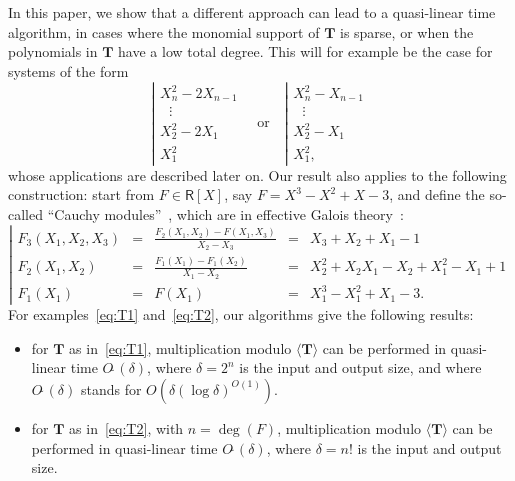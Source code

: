 \documentclass[amsthm]{elsart}
\def\T {\ensuremath{\mathbf{T}}}
\def\rng {\ensuremath{\mathsf{R}}}
\theoremstyle{plain}
\begin{document}
In this paper, we show that a different approach can lead to a
quasi-linear time algorithm, in cases where the monomial support of
$\T$ is sparse, or when the polynomials in $\T$ have a low total
degree. 
This will for example be the case for systems of the form
\begin{equation}
  \label{eq:T1}
\left | \begin{array}{l}
X_n^2-2X_{n-1}\\
~~~\vdots\\
X_2^2-2X_1\\
X_1^2
\end{array}\right .
\quad\text{or}\quad
\left | \begin{array}{l}
X_n^2-X_{n-1}\\
~~~\vdots\\
X_2^2-X_1\\
X_1^2,
\end{array}\right .
\end{equation}
whose applications are described later on. Our result also applies to
the following construction: start from $F\in \rng[X]$, say
$F=X^3-X^2+X-3$, and define the so-called ``Cauchy
modules''~\cite{ReVa99}, which are in effective Galois
theory~\cite{ReVa99,AbOrReVa04,ReYo06}:
\begin{equation}
  \label{eq:T2}
\left | \begin{array}{lllll}
F_3(X_1,X_2,X_3)&=&\frac{F_2(X_1,X_2)-F(X_1,X_3)}{X_2-X_3}&=&X_3+X_2+X_1-1\\[1mm]
F_2(X_1,X_2)&=&\frac{F_1(X_1)-F_1(X_2)}{X_1-X_2} &=& X_2^2 + X_2X_1 - X_2 + X_1^2 - X_1 + 1\\[1mm]
F_1(X_1)&=&F(X_1)&=&X_1^3-X_1^2+X_1-3.
\end{array}\right .
\end{equation}
For examples~\eqref{eq:T1} and~\eqref{eq:T2}, our algorithms give the
following results:

\smallskip

\begin{itemize}
\item for $\T$ as in~\eqref{eq:T1}, multiplication modulo $\langle \T
  \rangle$ can be performed in quasi-linear time $O\tilde{~}(\delta)$,
  where $\delta=2^n$ is the input and output size,
  and where $O\tilde{~}(\delta)$ stands for $O(\delta (\log \delta)^{O(1)})$.

\smallskip

\item for $\T$ as in~\eqref{eq:T2}, with $n=\deg(F)$, multiplication
  modulo $\langle \T \rangle$ can be performed in quasi-linear time
  $O\tilde{~}(\delta)$, where $\delta=n!$ is the input and output
  size.
\end{itemize}
\end{document}
